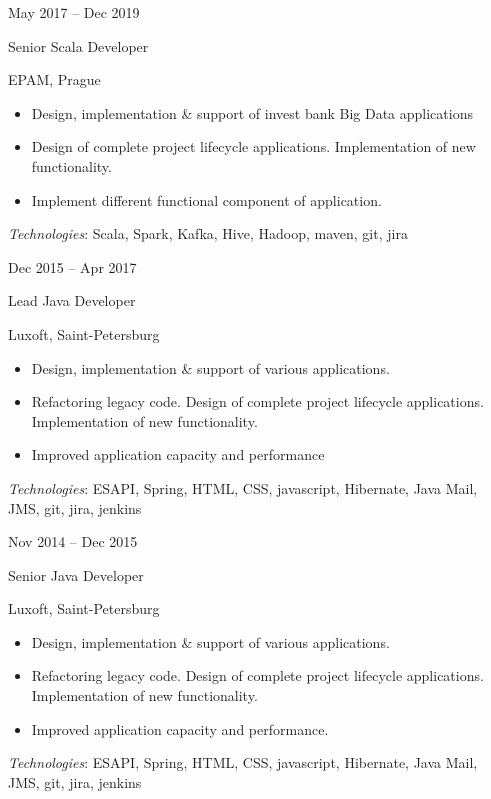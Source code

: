 \documentclass[a4paper,10pt]{article}
\newlength{\cvcolumngapwidth}
\newlength{\cvleftcolumnwidth}
\newlength{\cvrightcolumnwidth}
\newcommand{\cvtitlestyle}[1]{{\large\cvtitlefont\textcolor{cvtitlecolor}{#1}}}
\newcommand{\cvdurationstyle}[1]{{\small\cvdurationfont\textcolor{cvdurationcolor}{#1}}}
\newlength{\cvafteritemskipamount}
\newlength{\cvaftertitleskipamount}
\newlength{\cvparskip}
\newcommand{\cvitem}[2]{
    \begin{minipage}[t]{\cvleftcolumnwidth}
        \raggedleft #1
    \end{minipage}%
    \hspace{\cvcolumngapwidth}%
    \begin{minipage}[t]{\cvrightcolumnwidth}
        \setlength{\parskip}{\cvparskip} #2
    \end{minipage}

    \vspace{\cvafteritemskipamount}
}
\newcommand{\cvtitle}[1]{
    \cvtitlestyle{#1}

    \vspace{\cvaftertitleskipamount}
    \vspace{-\cvparskip}
}
\begin{document}
\cvitem{
    \cvdurationstyle{May 2017 -- Dec 2019}
}{
    \cvtitle{Senior Scala Developer}

    EPAM, Prague

    \begin{itemize}[leftmargin=*]
        \item Design, implementation \& support of invest bank Big Data applications
        \item Design of complete project lifecycle applications. Implementation of new functionality.
        \item Implement different functional component of application.
    \end{itemize}
    
    \textit{Technologies}: Scala, Spark, Kafka, Hive, Hadoop, maven, git, jira
}
\cvitem{
    \cvdurationstyle{Dec 2015 -- Apr 2017}
}{
    \cvtitle{Lead Java Developer}

    Luxoft, Saint-Petersburg
    
    \begin{itemize}[leftmargin=*]
        \item Design, implementation \& support of various applications.
        \item Refactoring legacy code. Design of complete project lifecycle applications. Implementation of new functionality.
        \item Improved application capacity and performance
    \end{itemize}
    
    \textit{Technologies}: ESAPI, Spring, HTML, CSS, javascript, Hibernate, Java Mail, JMS, git, jira, jenkins
}
\cvitem{
    \cvdurationstyle{Nov 2014 -- Dec 2015}
}{
    \cvtitle{Senior Java Developer}

    Luxoft, Saint-Petersburg
    
    \begin{itemize}[leftmargin=*]
        \item Design, implementation \& support of various applications.
        \item Refactoring legacy code. Design of complete project lifecycle applications. Implementation of new functionality.
        \item Improved application capacity and performance.
    \end{itemize}

    \textit{Technologies}: ESAPI, Spring, HTML, CSS, javascript, Hibernate, Java Mail, JMS, git, jira, jenkins
}
\end{document}
